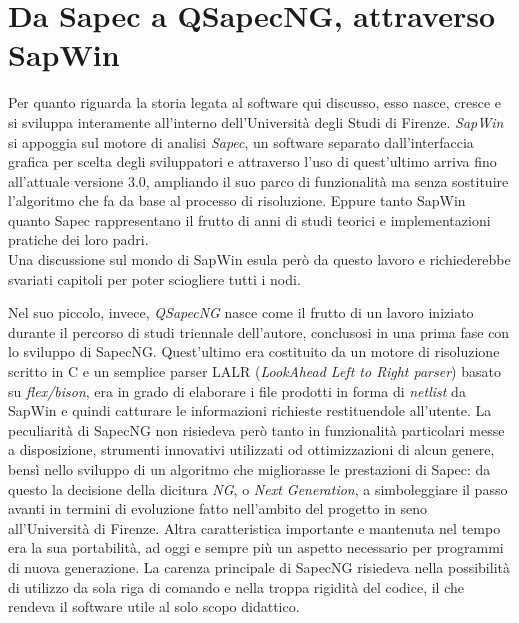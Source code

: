 \section{Da Sapec a QSapecNG, attraverso SapWin}

Per quanto riguarda la storia legata al software qui discusso, esso nasce, cresce e si sviluppa interamente all'interno dell'Università degli Studi di Firenze. \textit{SapWin} si appoggia sul motore di analisi \textit{Sapec}, un software separato dall'interfaccia grafica per scelta degli sviluppatori e attraverso l'uso di quest'ultimo arriva fino all'attuale versione 3.0, ampliando il suo parco di funzionalità ma senza sostituire l'algoritmo che fa da base al processo di risoluzione. Eppure tanto SapWin quanto Sapec rappresentano il frutto di anni di studi teorici e implementazioni pratiche dei loro padri.\\
Una discussione sul mondo di SapWin esula però da questo lavoro e richiederebbe svariati capitoli per poter sciogliere tutti i nodi.

Nel suo piccolo, invece, \textit{QSapecNG} nasce come il frutto di un lavoro iniziato durante il percorso di studi triennale dell'autore, conclusosi in una prima fase con lo sviluppo di SapecNG. Quest'ultimo era costituito da un motore di risoluzione scritto in C e un semplice parser LALR (\textit{LookAhead Left to Right parser}) basato su \textit{flex/bison}, era in grado di elaborare i file prodotti in forma di \textit{netlist} da SapWin e quindi catturare le informazioni richieste restituendole all'utente. La peculiarità di SapecNG non risiedeva però tanto in funzionalità particolari messe a disposizione, strumenti innovativi utilizzati od ottimizzazioni di alcun genere, bensì nello sviluppo di un algoritmo che migliorasse le prestazioni di Sapec: da questo la decisione della dicitura \textit{NG}, o \textit{Next Generation}, a simboleggiare il passo avanti in termini di evoluzione fatto nell'ambito del progetto in seno all'Università di Firenze. Altra caratteristica importante e mantenuta nel tempo era la sua portabilità, ad oggi e sempre più un aspetto necessario per programmi di nuova generazione. La carenza principale di SapecNG risiedeva nella possibilità di utilizzo da sola riga di comando e nella troppa rigidità del codice, il che rendeva il software utile al solo scopo didattico.

